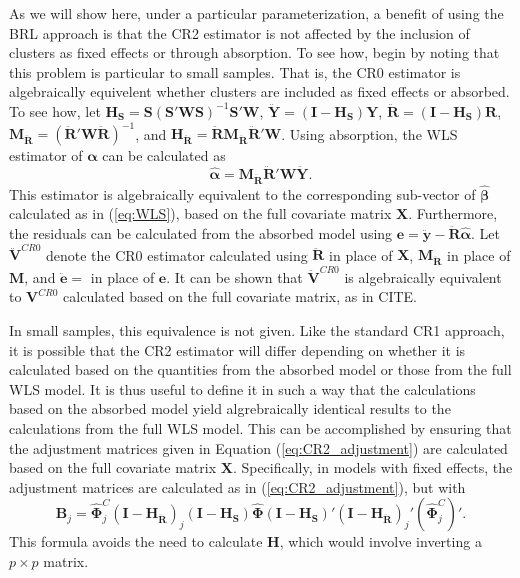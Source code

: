 \documentclass[12pt]{article}
\newcommand{\bm}{\mathbf}
\newcommand{\bs}{\boldsymbol}
\begin{document}
As we will show here, under a particular parameterization, a benefit of using the BRL approach is that the CR2 estimator is not affected by the inclusion of clusters as fixed effects or through absorption. 
To see how, begin by noting that this problem is particular to small samples. 
That is, the CR0 estimator is algebraically equivelent whether clusters are included as fixed effects or absorbed. 
To see how, let $\bm{H_S} = \bm{S}\left(\bm{S}'\bm{W}\bm{S}\right)^{-1} \bm{S}'\bm{W}$, $\bm{\ddot{Y}} = \left(\bm{I} - \bm{H_S}\right)\bm{Y}$, $\bm{\ddot{R}} = \left(\bm{I} - \bm{H_S}\right)\bm{R}$, $\bm{M_{\ddot{R}}} = \left(\bm{\ddot{R}}' \bm{W} \bm{\ddot{R}}\right)^{-1}$, and $\bm{H_{\ddot{R}}} = \bm{\ddot{R}}\bm{M_{\ddot{R}}} \bm{\ddot{R}}' \bm{W}$. 
Using absorption, the WLS estimator of $\bs\alpha$ can be calculated as \[
\bs{\hat\alpha} = \bm{M_{\ddot{R}}} \bm{\ddot{R}}' \bm{W} \bm{\ddot{Y}}. \]
This estimator is algebraically equivalent to the corresponding sub-vector of $\bs{\hat\beta}$  calculated as in (\ref{eq:WLS}), based on the full covariate matrix $\bm{X}$. 
Furthermore, the residuals can be calculated from the absorbed model using $\bm{e} = \bm{\ddot{y}} - \bm{\ddot{R}} \bs{\hat\alpha}$.
Let $\bm{\ddot{V}}^{CR0}$ denote the CR0 estimator calculated using $\bm{\ddot{R}}$ in place of $\bm{X}$, $\bm{M_{\ddot{R}}}$ in place of $\bm{M}$, and $\bm{\ddot{e}} = $ in place of $\bm{e}$. It can be shown that $\bm{\ddot{V}}^{CR0}$ is algebraically equivalent to $\bm{V}^{CR0}$ calculated based on the full covariate matrix, as in CITE.

In small samples, this equivalence is not given. Like the standard CR1 approach, it is possible that the CR2 estimator will differ depending on whether it is calculated based on the quantities from the absorbed model or those from the full WLS model. 
It is thus useful to define it in such a way that the calculations based on the absorbed model yield algrebraically identical results to the calculations from the full WLS model. 
This can be accomplished by ensuring that the adjustment matrices given in Equation (\ref{eq:CR2_adjustment}) are calculated based on the full covariate matrix $\bm{X}$. Specifically, in models with fixed effects, the adjustment matrices are calculated as in (\ref{eq:CR2_adjustment}), but with 
\begin{equation}
\label{eq:CR2_panel_adjustment}
\bm{B}_j = \hat{\bs\Phi}_j^C\left(\bm{I} - \bm{H_{\ddot{R}}}\right)_j \left(\bm{I} - \bm{H_S}\right) \hat{\bs\Phi} \left(\bm{I} - \bm{H_S}\right)' \left(\bm{I} - \bm{H_{\ddot{R}}}\right)_j' \left(\hat{\bs\Phi}_j^C\right)'.
\end{equation}
This formula avoids the need to calculate $\bm{H}$, which would involve inverting a $p \times p$ matrix. 
\end{document}
